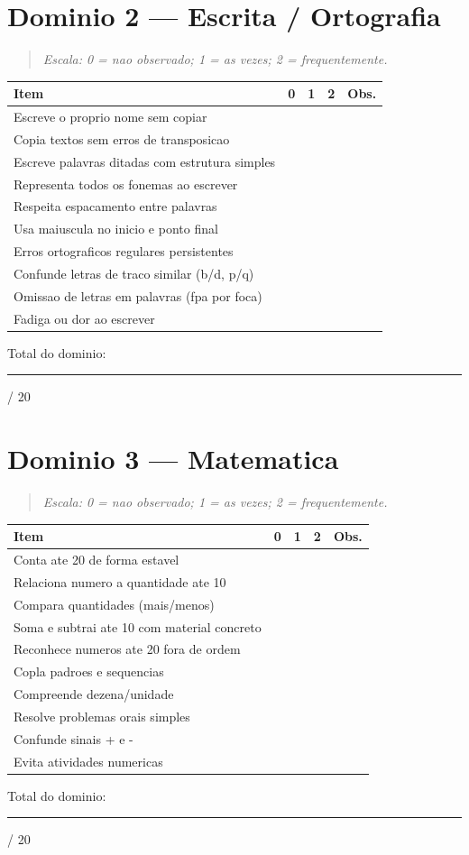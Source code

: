 \documentclass[a4paper,11pt]{book}
\begin{document}
\section{Dominio 2 --- Escrita / Ortografia}
\begin{quote}\itshape Escala: 0 = nao observado; 1 = as vezes; 2 = frequentemente.\end{quote}
\begin{tabular}{@{}p{10.5cm}ccc p{0.5cm}@{}}\toprule
Item & 0 & 1 & 2 & Obs. \\\midrule
Escreve o proprio nome sem copiar & & & & \\
Copia textos sem erros de transposicao & & & & \\
Escreve palavras ditadas com estrutura simples & & & & \\
Representa todos os fonemas ao escrever & & & & \\
Respeita espacamento entre palavras & & & & \\
Usa maiuscula no inicio e ponto final & & & & \\
Erros ortograficos regulares persistentes & & & & \\
Confunde letras de traco similar (b/d, p/q) & & & & \\
Omissao de letras em palavras (fpa por foca) & & & & \\
Fadiga ou dor ao escrever & & & & \\
\bottomrule\end{tabular}
\vspace{0.2cm}\noindent\small Total do dominio: \rule{1cm}{0.3pt} / 20\par\medskip


\section{Dominio 3 --- Matematica}
\begin{quote}\itshape Escala: 0 = nao observado; 1 = as vezes; 2 = frequentemente.\end{quote}
\begin{tabular}{@{}p{10.5cm}ccc p{0.5cm}@{}}\toprule
Item & 0 & 1 & 2 & Obs. \\\midrule
Conta ate 20 de forma estavel & & & & \\
Relaciona numero a quantidade ate 10 & & & & \\
Compara quantidades (mais/menos) & & & & \\
Soma e subtrai ate 10 com material concreto & & & & \\
Reconhece numeros ate 20 fora de ordem & & & & \\
Copla padroes e sequencias & & & & \\
Compreende dezena/unidade & & & & \\
Resolve problemas orais simples & & & & \\
Confunde sinais + e - & & & & \\
Evita atividades numericas & & & & \\
\bottomrule\end{tabular}
\vspace{0.2cm}\noindent\small Total do dominio: \rule{1cm}{0.3pt} / 20\par\medskip
\end{document}
